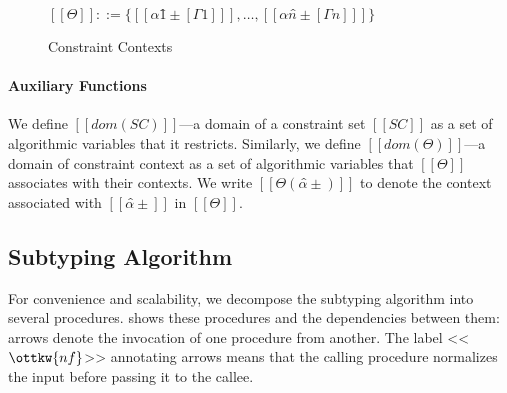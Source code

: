   \begin{figure}[h]
    \begin{center}
      $[[Θ]] ::= \{[[ α1̂±[Γ1] ]], \dots, [[ αn̂±[Γn] ]]\}$
    \end{center}
    \label{fig:constraint-context}
    \caption{Constraint Contexts}
  \end{figure}

\paragraph{Auxiliary Functions}
We define $[[dom(SC)]]$---a domain of a constraint set $[[SC]]$ as a set of algorithmic variables
that it restricts. Similarly, we define $[[dom(Θ)]]$---a domain of constraint context
as a set of algorithmic variables that $[[Θ]]$ associates with their contexts.
We write $[[Θ(α̂±)]]$ to denote the context associated with $[[α̂±]]$ in $[[Θ]]$.



\subsection{Subtyping Algorithm}
  
  For convenience and scalability, 
  we decompose the subtyping algorithm 
  into several procedures. 
  shows these procedures and the dependencies between them:
  arrows denote the invocation of one procedure from another.
  The label <<$\ottkw{nf}$>> annotating arrows means that the calling
  procedure normalizes the input before passing it to the callee.

